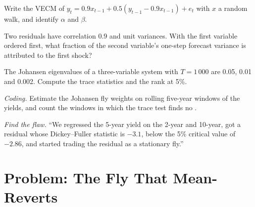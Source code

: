 \begin{exercise}[$\star\star$]\label{exo:qm:multivariate-series-and-cointegration:4}
Write the VECM of $y_t = 0.9x_{t-1} + 0.5(y_{t-1} - 0.9x_{t-1}) + e_t$ with $x$ a random walk, and identify $\alpha$ and $\beta$.
\end{exercise}

\begin{exercise}[$\star\star$]\label{exo:qm:multivariate-series-and-cointegration:5}
Two residuals have correlation 0.9 and unit variances. With the first variable ordered first, what fraction of the second variable's one-step forecast variance is
attributed to the first shock?
\end{exercise}

\begin{exercise}[$\star\star$]\label{exo:qm:multivariate-series-and-cointegration:6}
The Johansen eigenvalues of a three-variable system with $T = 1\,000$ are 0.05, 0.01 and 0.002. Compute the trace statistics and the rank at 5\%.
\end{exercise}

\begin{exercise}[$\star\star\star$]\label{exo:qm:multivariate-series-and-cointegration:7}
\emph{Coding.} Estimate the Johansen fly weights on rolling five-year windows of the yields, and count the windows in which the trace test finds no .
\end{exercise}

\begin{exercise}[$\star\star\star$]\label{exo:qm:multivariate-series-and-cointegration:8}
\emph{Find the flaw.} ``We regressed the 5-year yield on the 2-year and 10-year, got a residual whose Dickey--Fuller statistic is $-3.1$, below the 5\% critical value
of $-2.86$, and started trading the residual as a stationary fly.''
\end{exercise}

\section{Problem: The Fly That Mean-Reverts}

